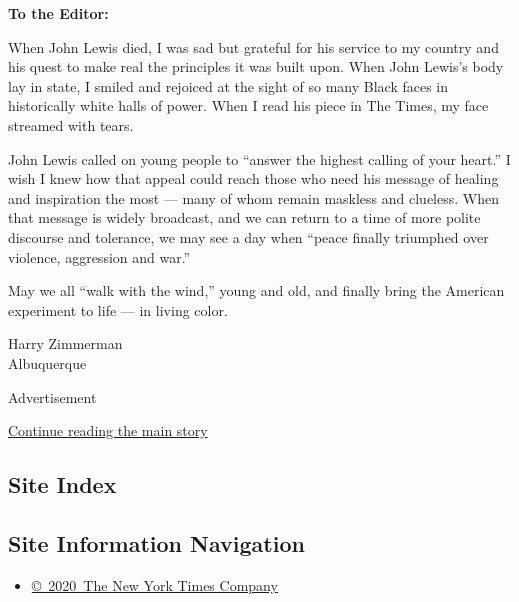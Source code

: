 \textbf{To the Editor:}

When John Lewis died, I was sad but grateful for his service to my
country and his quest to make real the principles it was built upon.
When John Lewis's body lay in state, I smiled and rejoiced at the sight
of so many Black faces in historically white halls of power. When I read
his piece in The Times, my face streamed with tears.

John Lewis called on young people to ``answer the highest calling of
your heart.'' I wish I knew how that appeal could reach those who need
his message of healing and inspiration the most --- many of whom remain
maskless and clueless. When that message is widely broadcast, and we can
return to a time of more polite discourse and tolerance, we may see a
day when ``peace finally triumphed over violence, aggression and war.''

May we all ``walk with the wind,'' young and old, and finally bring the
American experiment to life --- in living color.

Harry Zimmerman\\
Albuquerque

Advertisement

\protect\hyperlink{after-bottom}{Continue reading the main story}

\hypertarget{site-index}{%
\subsection{Site Index}\label{site-index}}

\hypertarget{site-information-navigation}{%
\subsection{Site Information
Navigation}\label{site-information-navigation}}

\begin{itemize}
\tightlist
\item
  \href{https://help.nytimes3xbfgragh.onion/hc/en-us/articles/115014792127-Copyright-notice}{©~2020~The
  New York Times Company}
\end{itemize}

